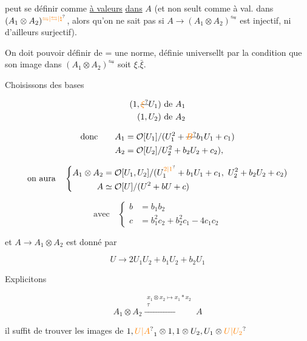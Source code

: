 

peut se définir comme \uline{à valeurs} \uline{dans} $A$ (et non seult comme à val. dans $(A_1\otimes A_2)^{\unsure{\leftrightharpoons|\leftrightarrows|\natural}}$, alors qu'on ne sait pas si $A\longrightarrow(A_1\otimes A_2)^{\leftrightharpoons}$ est  injectif, ni d'ailleurs surjectif).

On doit pouvoir définir de = une norme, définie universellt par la condition que son image dans $(A_1\otimes A_2)^{\leftrightharpoons}$ soit $\xi.\bar\xi$.

Choisissons des bases

\[
\begin{aligned}
(1,\deleted{\unsure{\xi}}U_1)&\ \text{de }A_1\\
(1,U_2)&\ \text{de }A_2
\end{aligned}
\]

\[
\begin{aligned}
\text{donc}\qquad A_1&=\mathcal O[U_1]/(U_1^2+\deleted{\unsure{B}}b_1U_1+c_1)\\
A_2&=\mathcal O[U_2]/U_2^2+b_2U_2+c_2),
\end{aligned}
\]

\[
\text{on aura}\quad
\left\{\begin{aligned}
A_1\otimes A_2&=\mathcal O[U_1,U_2]/(U_1^{\unsure{2|1}}+b_1U_1+c_1,\ U_2^2+b_2U_2+c_2)\\
A&\simeq\mathcal O[U]/(U^2+bU+c)
\end{aligned}\right.
\]

\[
\text{avec}\quad
\left\{\begin{aligned}
b&=b_1b_2\\
c&=b_1^2c_2+b_2^2c_1-4c_1c_2
\end{aligned}\right.
\]

et $A\longrightarrow A_1\otimes A_2$ est donné par

\[
U\longrightarrow2U_1U_2+b_1U_2+b_2U_1
\]

Explicitons

\[
A_1\otimes A_2\xrightarrow{\substack{x_1\otimes x_2\mapsto x_1*x_2\\\tau}}A
\]

il suffit de trouver les images de $1,\unsure{U|A}_1\otimes1,1\otimes U_2,U_1\otimes\unsure{U|U_2}$%


